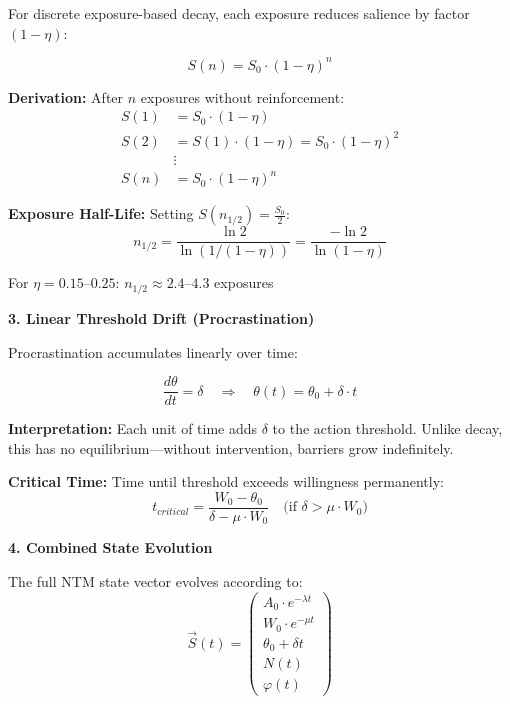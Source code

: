 \documentclass[11pt, a4paper]{article}
\begin{document}
\begin{tcolorbox}[colback=white, colframe=black!75!black,
    title=\textbf{Mathematical Derivation: NTM Decay Functions}]
For discrete exposure-based decay, each exposure reduces salience by factor $(1-\eta)$:

\begin{equation}
S(n) = S_0 \cdot (1-\eta)^n
\label{eq:salience-decay}
\end{equation}

\textbf{Derivation:} After $n$ exposures without reinforcement:
\begin{align}
S(1) &= S_0 \cdot (1-\eta) \\
S(2) &= S(1) \cdot (1-\eta) = S_0 \cdot (1-\eta)^2 \\
&\vdots \\
S(n) &= S_0 \cdot (1-\eta)^n
\end{align}

\textbf{Exposure Half-Life:} Setting $S(n_{1/2}) = \frac{S_0}{2}$:
\begin{equation}
n_{1/2} = \frac{\ln 2}{\ln(1/(1-\eta))} = \frac{-\ln 2}{\ln(1-\eta)}
\label{eq:exposure-half-life}
\end{equation}

For $\eta = 0.15$--$0.25$: $n_{1/2} \approx 2.4$--$4.3$ exposures

\vspace{0.5em}
\textbf{3. Linear Threshold Drift (Procrastination)}

Procrastination accumulates linearly over time:

\begin{equation}
\frac{d\theta}{dt} = \delta \quad \Rightarrow \quad \theta(t) = \theta_0 + \delta \cdot t
\label{eq:threshold-drift}
\end{equation}

\textbf{Interpretation:} Each unit of time adds $\delta$ to the action threshold. Unlike decay, this has no equilibrium---without intervention, barriers grow indefinitely.

\textbf{Critical Time:} Time until threshold exceeds willingness permanently:
\begin{equation}
t_{critical} = \frac{W_0 - \theta_0}{\delta - \mu \cdot W_0} \quad \text{(if } \delta > \mu \cdot W_0 \text{)}
\end{equation}

\vspace{0.5em}
\textbf{4. Combined State Evolution}

The full NTM state vector evolves according to:
\begin{equation}
\vec{S}(t) = \begin{pmatrix} A_0 \cdot e^{-\lambda t} \\ W_0 \cdot e^{-\mu t} \\ \theta_0 + \delta t \\ N(t) \\ \varphi(t) \end{pmatrix}
\label{eq:state-evolution}
\end{equation}


\end{tcolorbox}
\end{document}

